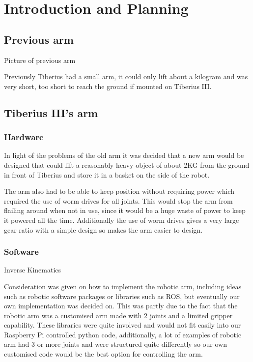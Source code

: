 \section{Introduction and Planning}
\subsection{Previous arm}
Picture of previous arm

Previously Tiberius had a small arm, it could only lift about a kilogram and was very short, too short to reach the ground if mounted on Tiberius III.  
\subsection{Tiberius III's arm}
\subsubsection{Hardware}
In light of the problems of the old arm it was decided that a new arm would be designed that could lift a reasonably heavy object of about 2KG from the ground in front of Tiberius and store it in a basket on the side of the robot.

The arm also had to be able to keep position without requiring power which required the use of worm drives for all joints. This would stop the arm from flailing around when not in use, since it would be a huge waste of power to keep it powered all the time. Additionally the use of worm drives gives a very large gear ratio with a simple design so makes the arm easier to design.

\subsubsection{Software}

Inverse Kinematics

Consideration was given on how to implement the robotic arm, including ideas such as robotic software packages or libraries such as ROS, but eventually our own implementation was decided on.  This was partly due to the fact that the robotic arm was a customised arm made with 2 joints and a limited gripper capability.  These libraries were quite involved and would not fit easily into our Raspberry Pi controlled python code, additionally, a lot of examples of robotic arm had 3 or more joints and were structured quite differently so our own customised code would be the best option for controlling the arm.


